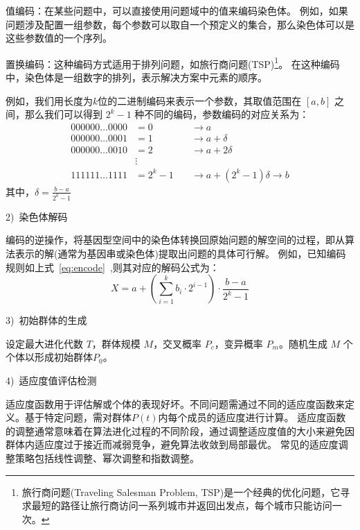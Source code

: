     值编码：在某些问题中，可以直接使用问题域中的值来编码染色体。
    例如，如果问题涉及配置一组参数，每个参数可以取自一个预定义的集合，那么染色体可以是这些参数值的一个序列。

    置换编码：这种编码方式适用于排列问题，如旅行商问题(TSP)\footnote{旅行商问题(Traveling Salesman Problem, TSP)是一个经典的优化问题，它寻求最短的路径让旅行商访问一系列城市并返回出发点，每个城市只能访问一次。}。
    在这种编码中，染色体是一组数字的排列，表示解决方案中元素的顺序。

    例如，我们用长度为$k$位的二进制编码来表示一个参数，其取值范围在 $[a, b]$ 之间，那么我们可以得到 $2^k−1$ 种不同的编码，参数编码的对应关系为：
    \begin{equation}
      \label{eq:encode}
      \begin{aligned}
        000000\dots0000 &= 0 \quad &\rightarrow a \\
        000000\dots0001 &= 1 \quad &\rightarrow a + \delta \\
        000000\dots0010 &= 2 \quad &\rightarrow a + 2\delta \\
        &\vdots \\
        111111\dots1111 &= 2^k - 1 \quad &\rightarrow a + (2^k - 1)\delta \rightarrow b
      \end{aligned}
    \end{equation}    
    其中，$\delta = \frac{b-a}{2^k - 1}$

    2)~染色体解码\par
    编码的逆操作，将基因型空间中的染色体转换回原始问题的解空间的过程，即从算法表示的解(通常为基因串或染色体)提取出问题的具体可行解。
    例如，已知编码规则如上式~\ref{eq:encode}~,则其对应的解码公式为：
    \begin{equation}
      \label{eq:decode}
      X = a + (\sum\limits_{i=1}^{k}b_i \cdot 2^{i-1}) \cdot \frac{b-a}{2^k-1}
    \end{equation}

    3)~初始群体的生成\par

设定最大进化代数 \(T\)，群体规模 \(M\)，交叉概率 \(P_c\)，变异概率 \(P_m\)。随机生成 \(M\) 个个体以形成初始群体\(P_0\)。

    4)~适应度值评估检测\par
适应度函数用于评估解或个体的表现好坏。不同问题需通过不同的适应度函数来定义。基于特定问题，需对群体$P(t)$内每个成员的适应度进行计算。
适应度函数的调整通常意味着在算法进化过程的不同阶段，通过调整适应度值的大小来避免因群体内适应度过于接近而减弱竞争，避免算法收敛到局部最优。
常见的适应度调整策略包括线性调整、幂次调整和指数调整。

